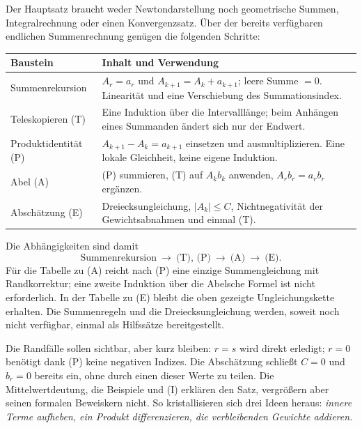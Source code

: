 Der Hauptsatz braucht weder Newtondarstellung noch geometrische
Summen, Integralrechnung oder einen Konvergenzsatz. Über der bereits
verfügbaren endlichen Summenrechnung genügen die folgenden Schritte:
\begin{center}
\small
\renewcommand{\arraystretch}{1.15}
\begin{tabularx}{\linewidth}{@{}p{.20\linewidth}X@{}}
\toprule
Baustein & Inhalt und Verwendung\\
\midrule
Summenrekursion &
$A_r=a_r$ und $A_{k+1}=A_k+a_{k+1}$; leere Summe $=0$.
Linearität und eine Verschiebung des Summationsindex.\\
Teleskopieren (T) &
Eine Induktion über die Intervalllänge; beim Anhängen eines Summanden
ändert sich nur der Endwert.\\
Produktidentität (P) &
$A_{k+1}-A_k=a_{k+1}$ einsetzen und ausmultiplizieren.
Eine lokale Gleichheit, keine eigene Induktion.\\
Abel (A) &
(P) summieren, (T) auf $A_kb_k$ anwenden,
$A_rb_r=a_rb_r$ ergänzen.\\
Abschätzung (E) &
Dreiecksungleichung, $|A_k|\leq C$, Nichtnegativität der
Gewichtsabnahmen und einmal (T).\\
\bottomrule
\end{tabularx}
\end{center}

Die Abhängigkeiten sind damit
\[
 \text{Summenrekursion}\ \longrightarrow\ \text{(T), (P)}
 \ \longrightarrow\ \text{(A)}\ \longrightarrow\ \text{(E)}.
\]
Für die Tabelle zu (A) reicht nach (P) eine einzige Summengleichung
mit Randkorrektur; eine zweite Induktion über die Abelsche Formel
ist nicht erforderlich. In der Tabelle zu (E) bleibt die oben
gezeigte Ungleichungskette erhalten. Die Summenregeln und die
Dreiecksungleichung werden, soweit noch nicht verfügbar, einmal als
Hilfssätze bereitgestellt.

Die Randfälle sollen sichtbar, aber kurz bleiben: $r=s$ wird direkt
erledigt; $r=0$ benötigt dank (P) keine negativen Indizes.
Die Abschätzung schließt $C=0$ und $b_r=0$ bereits ein, ohne durch
einen dieser Werte zu teilen. Die Mittelwertdeutung, die Beispiele
und (I) erklären den Satz, vergrößern aber seinen formalen Beweiskern
nicht. So kristallisieren sich drei Ideen heraus: \emph{innere Terme
aufheben, ein Produkt differenzieren, die verbleibenden Gewichte addieren.}
